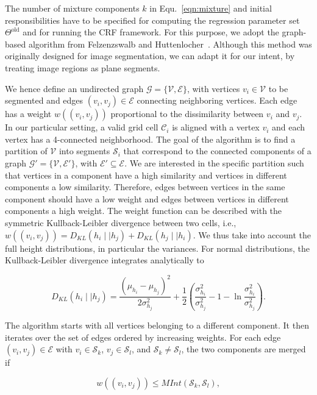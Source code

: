 The number of mixture components $k$ in Equ.~\eqref{eqn:mixture} and initial
responsibilities have to be specified for computing the regression parameter set
$\Theta^\text{old}$ and for running the CRF framework. For this purpose, we
adopt the graph-based algorithm from Felzenzswalb and
Huttenlocher~\cite{felzenszwalb04efficient}. Although this method was originally
designed for image segmentation, we can adapt it for our intent, by treating
image regions as plane segments.

We hence define an undirected graph $\mathcal{G}=\{\mathcal{V},\mathcal{E}\}$,
with vertices $v_i\in\mathcal{V}$ to be segmented and edges $(v_i,v_j)
\in\mathcal{E}$ connecting neighboring vertices. Each edge has a weight
$w((v_i,v_j))$ proportional to the dissimilarity between $v_i$ and $v_j$. In our
particular setting, a valid grid cell $\mathcal{C}_i$ is aligned with a
vertex $v_i$ and each vertex has a 4-connected neighborhood. The goal of the
algorithm is to find a partition of $\mathcal{V}$ into segments $\mathcal{S}_i$
that correspond to the connected components of a graph
$\mathcal{G}'=\{\mathcal{V},\mathcal{E}'\}$, with $\mathcal{E}'\subseteq
\mathcal{E}$. We are interested in the specific
partition such that vertices in a component have a high similarity and vertices
in different components a low similarity. Therefore, edges between vertices in
the same component should have a low weight and edges between vertices in
different components a high weight. The weight function can be described with
the symmetric Kullback-Leibler divergence between two cells, i.e.,
$w((v_i,v_j))=D_{KL}(h_i\mid\mid h_j)+D_{KL}(h_j\mid\mid h_i)$. We thus take
into account the full height distributions, in particular the variances. For
normal distributions, the Kullback-Leibler divergence integrates analytically to

\begin{equation}
\label{eqn:kl}
D_{KL}(h_i\mid\mid h_j)=\frac{(\mu_{h_i}-\mu_{h_j})^2}{2\sigma_{h_j}^2}+
\frac{1}{2}(\frac{\sigma_{h_i}^2}{\sigma_{h_j}^2}-1-\ln\frac{\sigma_{h_i}^2}
{\sigma_{h_j}^2}).
\end{equation}

The algorithm starts with all vertices belonging to a different component. It
then iterates over the set of edges ordered by increasing weights. For each
edge $(v_i,v_j)\in\mathcal{E}$ with $v_i\in\mathcal{S}_k$,
$v_j\in\mathcal{S}_l$, and $\mathcal{S}_k\neq\mathcal{S}_l$, the two components
are merged if

\begin{equation}
\label{eqn:merge}
w((v_i,v_j))\leq MInt(\mathcal{S}_k, \mathcal{S}_l),
\end{equation}


